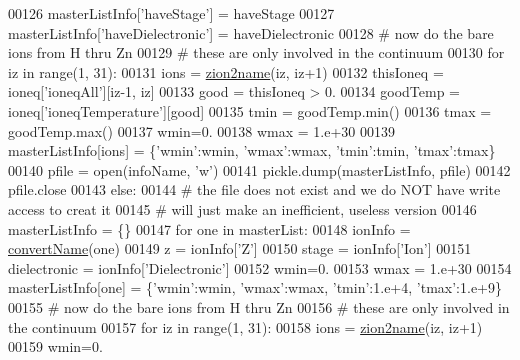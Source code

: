 \begin{DoxyCode}
{00126         masterListInfo[\textcolor{stringliteral}{'haveStage'}] = haveStage
00127         masterListInfo[\textcolor{stringliteral}{'haveDielectronic'}] = haveDielectronic
00128         \textcolor{comment}{#  now do the bare ions from H thru Zn}
00129         \textcolor{comment}{#  these are only involved in the continuum}
00130         \textcolor{keywordflow}{for} iz \textcolor{keywordflow}{in} range(1, 31):
00131             ions = \hyperlink{namespacepyneb_1_1utils_1_1__chianti__tools_a7d6debb5f68b52f64c311ca1fe99945c}{zion2name}(iz, iz+1)
00132             thisIoneq = ioneq[\textcolor{stringliteral}{'ioneqAll'}][iz-1, iz]
00133             good = thisIoneq > 0.
00134             goodTemp = ioneq[\textcolor{stringliteral}{'ioneqTemperature'}][good]
00135             tmin = goodTemp.min()
00136             tmax = goodTemp.max()
00137             wmin=0.
00138             wmax = 1.e+30
00139             masterListInfo[ions] = \{\textcolor{stringliteral}{'wmin'}:wmin, \textcolor{stringliteral}{'wmax'}:wmax, \textcolor{stringliteral}{'tmin'}:tmin, \textcolor{stringliteral}{'tmax'}:tmax\}
00140         pfile = open(infoName, \textcolor{stringliteral}{'w'})
00141         pickle.dump(masterListInfo, pfile)
00142         pfile.close
00143     \textcolor{keywordflow}{else}:
00144         \textcolor{comment}{# the file does not exist and we do NOT have write access to creat it}
00145         \textcolor{comment}{# will just make an inefficient, useless version}
00146         masterListInfo = \{\}
00147         \textcolor{keywordflow}{for} one \textcolor{keywordflow}{in} masterList:
00148             ionInfo = \hyperlink{namespacepyneb_1_1utils_1_1__chianti__tools_a8038874902563556b0a8b536f52d3194}{convertName}(one)
00149             z = ionInfo[\textcolor{stringliteral}{'Z'}]
00150             stage = ionInfo[\textcolor{stringliteral}{'Ion'}]
00151             dielectronic = ionInfo[\textcolor{stringliteral}{'Dielectronic'}]
00152             wmin=0.
00153             wmax = 1.e+30
00154             masterListInfo[one] = \{\textcolor{stringliteral}{'wmin'}:wmin, \textcolor{stringliteral}{'wmax'}:wmax, \textcolor{stringliteral}{'tmin'}:1.e+4, \textcolor{stringliteral}{'tmax'}:1.e+9\}
00155         \textcolor{comment}{#  now do the bare ions from H thru Zn}
00156         \textcolor{comment}{#  these are only involved in the continuum}
00157         \textcolor{keywordflow}{for} iz \textcolor{keywordflow}{in} range(1, 31):
00158             ions = \hyperlink{namespacepyneb_1_1utils_1_1__chianti__tools_a7d6debb5f68b52f64c311ca1fe99945c}{zion2name}(iz, iz+1)
00159             wmin=0.
}
\end{DoxyCode}

